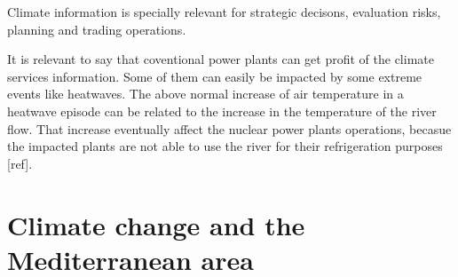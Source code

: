 Climate information is specially relevant for strategic decisons, evaluation risks, planning and trading operations.


It is relevant to say that coventional power plants can get profit of the climate services information. Some of them can easily be impacted by some extreme events like heatwaves. The above normal increase of air temperature in a heatwave episode can be related to the increase in the temperature of the river flow. That increase eventually affect the nuclear power plants operations, becasue the impacted plants are not able to use the river for their refrigeration purposes [ref].   

\section{Climate change and the Mediterranean area}


